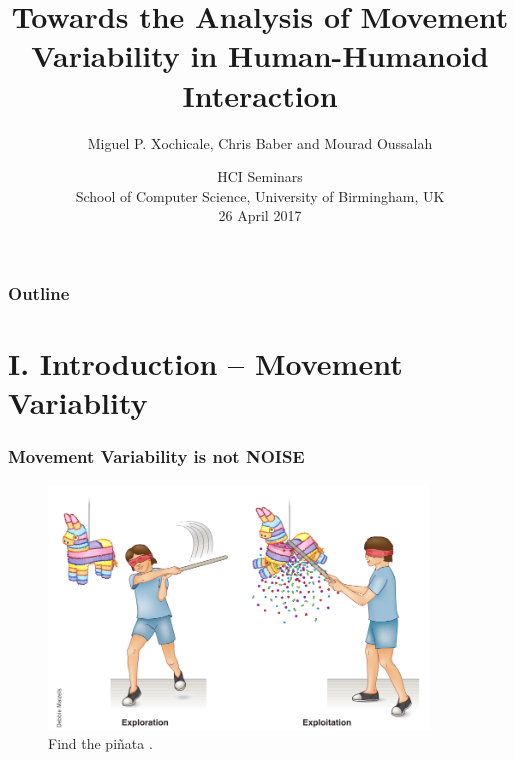 \documentclass{beamer}
\title[]
{Towards the Analysis of Movement Variability in Human-Humanoid Interaction}
\author[Miguel P. Xochicale]
{   %
    Miguel P. Xochicale\inst{1}, Chris Baber\inst{1} and Mourad Oussalah\inst{2}
}
\institute[CVC-IIIA]
{   %

      \vspace{5mm}
    \begin{tabular}{c}
    \inst{1} School of Engineering, University of Birmingham, U.K. \\
    \inst{2} Center for Ubiquitous Computing, University of Oulu, Finland
    \end{tabular}
}
\date[DEMO-2013]
{   %
      \vspace{5mm}
     HCI Seminars \\
     School of Computer Science, University of Birmingham, UK \\
     26 April 2017
}
\begin{document}
\frame{\titlepage}%





\begin{frame}
\frametitle{Outline}
\tableofcontents
\end{frame}




\section{I. Introduction -- Movement Variablity}




\begin{frame}
  \frametitle{Movement Variability is not NOISE}

\vspace{-1cm}
\begin{figure}
\includegraphics[width=0.9\textwidth]{herzfelt2014_fig1}
\centering
\caption{Find the pi\~nata \textcolor{red}{\textbf{  \cite{Herzfeld2014}   }}.}
 \end{figure}


\end{frame}
\end{document}
